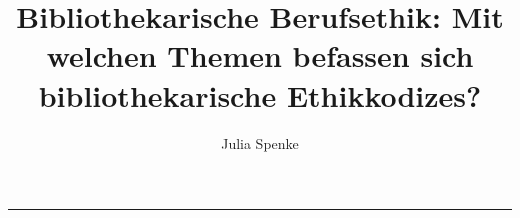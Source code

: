 \documentclass[output=paper]{langscibook}
\title{Bibliothekarische Berufsethik: Mit welchen Themen befassen sich bibliothekarische Ethikkodizes?}
\author{Julia Spenke}
\begin{document}
\maketitle


\begin{center}\rule{0.5\linewidth}{0.5pt}\end{center}

\end{document}
